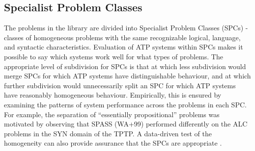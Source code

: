 \documentclass[runningheads]{llncs}
\begin{document}
\subsection{Specialist Problem Classes}
\label{SPCs}

The problems in the library are divided into Specialist Problem Classes (SPCs) - classes of 
homogeneous problems with the same recognizable logical, language, and syntactic characteristics.
Evaluation of ATP systems within SPCs makes it possible to say which systems work well for what 
types of problems. 
The appropriate level of subdivision for SPCs is that at which less subdivision would merge 
SPCs for which ATP systems have distinguishable behaviour, and at which further subdivision
would unnecessarily split an SPC for which ATP systems have reasonably homogeneous behaviour.
Empirically, this is ensured by examining the patterns of system performance across the 
problems in each SPC. 
For example, the separation of ``essentially propositional'' problems was motivated by observing 
that SPASS (WA+99) performed differently on the ALC problems in the SYN domain of the TPTP.
A data-driven test of the homogeneity can also provide assurance that the SPCs are
appropriate \cite{FS02}.
\end{document}
